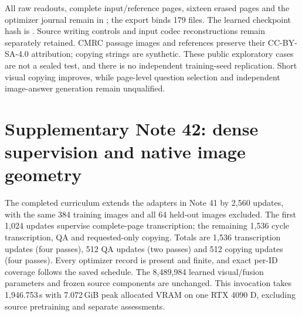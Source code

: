 \documentclass[10pt,a4paper]{article}
\begin{document}
All raw readouts, complete input/reference pages, sixteen erased pages and
the optimizer journal remain in
; the export binds
179 files. The learned checkpoint hash is
.
Source writing controls and input codec reconstructions remain separately
retained. CMRC passage images and references preserve their CC-BY-SA-4.0
attribution\cite{cmrc}; copying strings are synthetic. These public exploratory
cases are not a sealed test, and there is no independent training-seed
replication. Short visual copying improves, while page-level question
selection and independent image-answer generation remain unqualified.


\clearpage
\section*{Supplementary Note 42: dense supervision and native image geometry}
The completed curriculum extends the adapters in Note 41 by 2,560 updates,
with the same 384 training images and all 64 held-out images excluded.
The first 1,024 updates supervise complete-page transcription; the remaining
1,536 cycle transcription, QA and requested-only copying. Totals are 1,536
transcription updates (four passes), 512 QA updates (two passes) and 512
copying updates (four passes). Every optimizer record is present and finite,
and exact per-ID coverage follows the saved schedule. The 8,489,984 learned
visual/fusion parameters and frozen source components are unchanged. This
invocation takes 1,946.753\,s with 7.072\,GiB peak allocated VRAM on one
RTX 4090 D, excluding source pretraining and separate assessments.
\end{document}
